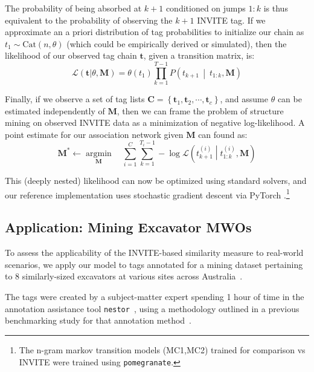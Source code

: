 \documentclass[%
	12pt,
		oneside,
		letterpaper
]{book}
\begin{document}
The probability of being absorbed at \(k+1\) conditioned on jumps
\(1:k\) is thus equivalent to the probability of observing the \(k+1\)
INVITE tag. If we approximate an a priori distribution of tag
probabilities to initialize our chain as \(t_1\sim\text{Cat}(n,\theta)\)
(which could be empirically derived or simulated), then the likelihood
of our observed tag chain \(\mathbf{t}\), given a transition matrix, is:
\[
\mathcal{L}\left(\mathbf{t}| \theta, \mathbf{M}\right) =
        \theta(t_1)\prod_{k=1}^{T-1} P\left(t_{k+1}\,\middle|\ t_{1:k},\mathbf{M}\right)
\]

Finally, if we observe a set of tag lists
\(\mathbf{C} = \left\{ \mathbf{t}_1, \mathbf{t}_2, \cdots, \mathbf{t}_{c} \right\}\),
and assume \(\theta\) can be estimated independently of \(\mathbf{M}\),
then we can frame the problem of structure mining on observed INVITE
data as a minimization of negative log-likelihood. A point estimate for
our association network given \(\mathbf{M}\) can found as: \[
    \mathbf{M}^* \leftarrow \operatorname*{argmin}_{\mathbf{M}} \quad
    \sum_{i=1}^{C}
    \sum_{k=1}^{T_i-1}
        -\log \mathcal{L} \left(t^{(i)}_{k+1} \middle| t^{(i)}_{1:k},\mathbf{M}\right)
\]

This (deeply nested) likelihood can now be optimized using standard
solvers, and our reference implementation uses stochastic gradient
descent via PyTorch
\autocite{AutomaticdifferentiationPyTorch_Paszke2017}.\footnote{ The
  n-gram markov transition models (MC1,MC2) trained for comparison vs
  INVITE were trained using
  \texttt{pomegranate}\autocite{Pomegranatefastflexible_Schreiber2018}.}

\subsection{Application: Mining Excavator
MWOs}\label{application-mining-excavator-mwos}

To assess the applicability of the INVITE-based similarity measure to
real-world scenarios, we apply our model to tags annotated for a mining
dataset pertaining to 8 similarly-sized excavators at various sites
across
Australia~\autocite{Whyautonomousassets_Hodkiewicz2017,Cleaninghistoricalmaintenance_Hodkiewicz2016}.

The tags were created by a subject-matter expert spending 1 hour of time
in the annotation assistance tool
\texttt{nestor}~\autocite{NestorToolNatural_Sexton2019}, using a
methodology outlined in a previous benchmarking study for that
annotation method~\autocite{BenchmarkingKeywordExtraction_Sexton2018}.
\end{document}
